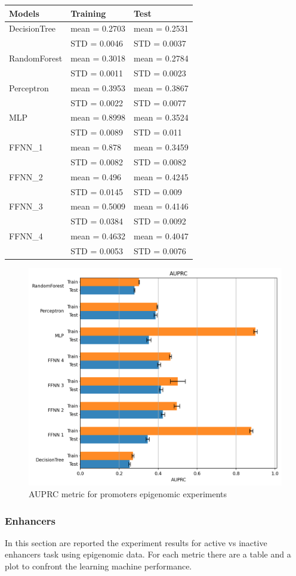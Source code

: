 \begin{longtable}[]{@{}lll@{}}
\toprule
\textbf{Models} & \textbf{Training} & \textbf{Test}\tabularnewline
\midrule
\endhead
DecisionTree & mean = 0.2703 & mean = 0.2531\tabularnewline
& STD = 0.0046 & STD = 0.0037\tabularnewline
RandomForest & mean = 0.3018 & mean = 0.2784\tabularnewline
& STD = 0.0011 & STD = 0.0023\tabularnewline
Perceptron & mean = 0.3953 & mean = 0.3867\tabularnewline
& STD = 0.0022 & STD = 0.0077\tabularnewline
MLP & mean = 0.8998 & mean = 0.3524\tabularnewline
& STD = 0.0089 & STD = 0.011\tabularnewline
FFNN\_1 & mean = 0.878 & mean = 0.3459\tabularnewline
& STD = 0.0082 & STD = 0.0082\tabularnewline
FFNN\_2 & mean = 0.496 & mean = 0.4245\tabularnewline
& STD = 0.0145 & STD = 0.009\tabularnewline
FFNN\_3 & mean = 0.5009 & mean = 0.4146\tabularnewline
& STD = 0.0384 & STD = 0.0092\tabularnewline
FFNN\_4 & mean = 0.4632 & mean = 0.4047\tabularnewline
& STD = 0.0053 & STD = 0.0076\tabularnewline
\bottomrule
\end{longtable}

\begin{figure}[h!]
\centering
\includegraphics[width=0.77\linewidth]{../images/epigemomic_results/promoters/auprc.png}
\caption{AUPRC metric for promoters epigenomic experiments}
\end{figure}

\subsubsection{Enhancers}

In this section are reported the experiment results for active vs
inactive enhancers task using epigenomic data. For each metric there are
a table and a plot to confront the learning machine performance.

